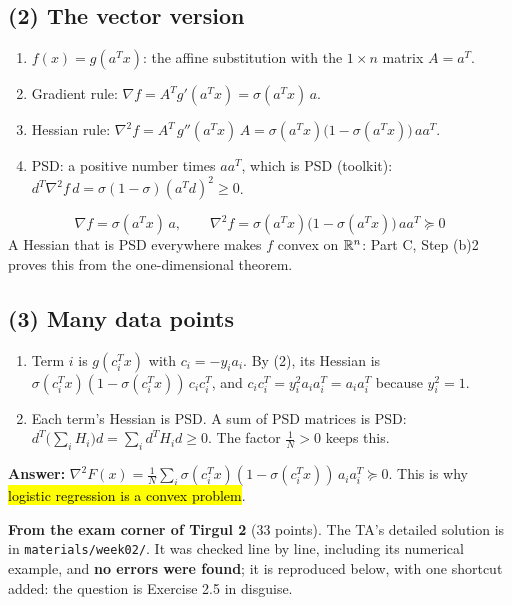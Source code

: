 \subsection*{(2) The vector version}
\begin{enumerate}
  \item $f(x)=g(a^Tx)$: the affine substitution with the $1\times n$ matrix $A=a^T$.
  \item Gradient rule: $\nabla f=A^Tg'(a^Tx)=\sigma(a^Tx)\,a$.
  \item Hessian rule: $\nabla^2f=A^T\,g''(a^Tx)\,A=\sigma(a^Tx)\big(1-\sigma(a^Tx)\big)\,aa^T$.
  \item PSD: a positive number times $aa^T$, which is PSD (toolkit): $d^T\nabla^2f\,d=\sigma(1-\sigma)(a^Td)^2\ge0$.
\end{enumerate}
\[ \boxed{\ \nabla f=\sigma(a^Tx)\,a,\qquad \nabla^2f=\sigma(a^Tx)\big(1-\sigma(a^Tx)\big)\,aa^T\succeq0\ } \]
A Hessian that is PSD everywhere makes $f$ convex on $\mathbb{R}^n$: Part C, Step (b)2 proves this from the one-dimensional theorem.

\subsection*{(3) Many data points}
\begin{enumerate}
  \item Term $i$ is $g(c_i^Tx)$ with $c_i=-y_ia_i$. By (2), its Hessian is $\sigma(c_i^Tx)(1-\sigma(c_i^Tx))\,c_ic_i^T$, and $c_ic_i^T=y_i^2a_ia_i^T=a_ia_i^T$ because $y_i^2=1$.
  \item Each term's Hessian is PSD. A sum of PSD matrices is PSD: $d^T\big(\sum_iH_i\big)d=\sum_id^TH_id\ge0$. The factor $\frac1N>0$ keeps this.
\end{enumerate}
\textbf{Answer:} $\nabla^2F(x)=\frac1N\sum_i\sigma(c_i^Tx)(1-\sigma(c_i^Tx))\,a_ia_i^T\succeq0$. This is why \hl{logistic regression is a convex problem}.


\begin{plainbox}
\textbf{From the exam corner of Tirgul 2} (33 points). The TA's detailed solution is in \texttt{materials/week02/}. It was checked line by line, including its numerical example, and \textbf{no errors were found};
it is reproduced below, with one shortcut added: the question is Exercise 2.5 in disguise.
\end{plainbox}

